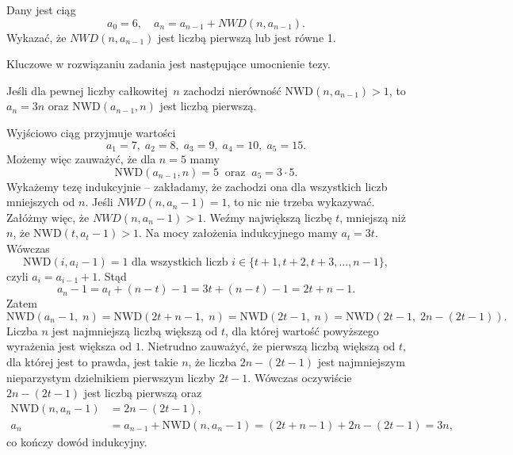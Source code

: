 \vspace{5px}

\begin{problem}{7}
	Dany jest ciąg
	\[
		a_0 = 6, \quad a_n = a_{n - 1} + NWD(n, a_{n - 1}).
	\]
	Wykazać, że $NWD(n, a_{n - 1})$ jest liczbą pierwszą lub jest równe 1.
\end{problem}


\noindent
Kluczowe w rozwiązaniu zadania jest następujące umocnienie tezy.

\vspace{5px}

\noindent
Jeśli dla pewnej liczby całkowitej~$n$ zachodzi nierówność $\mathrm{NWD}(n, a_{n - 1}) > 1$, to $a_n = 3n$ oraz $\mathrm{NWD}(a_{n − 1}, n)$ jest liczbą pierwszą. 

\vspace{10px}
\noindent
Wyjściowo ciąg przyjmuje wartości
\[
	a_1 = 7, \; a_2 = 8, \; a_3 = 9, \; a_4 = 10, \; a_5 = 15.
\] 
Możemy więc zauważyć, że dla $n = 5$ mamy 
\[
	\mathrm{NWD}(a_{n − 1}, n) = 5 \;\; \text{oraz} \;\; a_5 = 3 \cdot 5.
\]
 Wykażemy tezę indukcyjnie -- zakładamy, że zachodzi ona dla wszystkich liczb mniejszych od $n$. Jeśli $NWD(n, a_n - 1) = 1$, to nic nie trzeba wykazywać. Załóżmy więc, że $NWD(n, a_n - 1) > 1$.  Weźmy największą liczbę $t$, mniejszą niż $n$, że $\mathrm{NWD}(t, a_t − 1) > 1$. Na mocy założenia indukcyjnego mamy $a_t = 3t.$
 Wówczas 
 \[
 	\mathrm{NWD}(i, a_i − 1) = 1 \text{ dla wszystkich liczb } i \in \{t + 1, t + 2, t + 3, ..., n - 1\},
 \] 
czyli $a_{i} = a_{i - 1} + 1$. Stąd
\[
	a_n − 1 = a_t + (n − t) − 1 = 3t + (n - t) - 1 =  2t + n − 1.
\]
Zatem 
\[
	\mathrm{NWD}(a_n − 1,\; n) = \mathrm{NWD}(2t + n - 1,\; n) = \mathrm{NWD}(2t - 1,\; n) = \mathrm{NWD}(2t - 1,\; 2n - (2t - 1)).
\] 
Liczba $n$ jest najmniejszą liczbą większą od $t$, dla której wartość powyższego wyrażenia jest większa od $1$. Nietrudno zauważyć, że pierwszą liczbą większą od $t$, dla której jest to prawda, jest takie $n$, że liczba $2n - (2t - 1)$ jest najmniejszym nieparzystym dzielnikiem pierwszym liczby $2t - 1$. Wówczas oczywiście $2n - (2t - 1)$ jest liczbą pierwszą oraz
\begin{align*}
	\mathrm{NWD}(n, a_n − 1) &= 2n - (2t - 1), \\
	a_n &= a_{n - 1} + \mathrm{NWD}(n, a_n − 1) = (2t + n − 1 ) + 2n - (2t - 1) = 3n,
\end{align*}
co kończy dowód indukcyjny.

